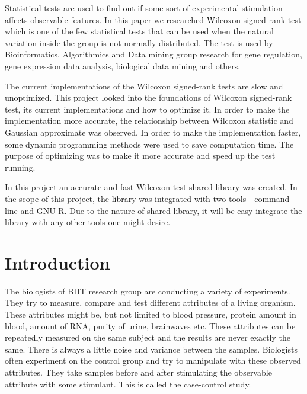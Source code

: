 \documentclass[12pt]{article}
\begin{document}
{
Statistical tests are used to find out if some sort of experimental stimulation affects observable features. In this paper we researched Wilcoxon signed-rank test which is one of the few statistical tests that can be used when the natural variation inside the group is not normally distributed. The test is used by Bioinformatics, Algorithmics and Data mining group research for gene regulation, gene expression data analysis, biological data mining and others.

The current implementations of the Wilcoxon signed-rank tests are slow and unoptimized. This project looked into the foundations of Wilcoxon signed-rank test, its current implementations and how to optimize it. In order to make the implementation more accurate, the relationship between Wilcoxon statistic and Gaussian approximate was observed. In order to make the implementation faster, some dynamic programming methods were used to save computation time. The purpose of optimizing was to make it more accurate and speed up the test running.

In this project an accurate and fast Wilcoxon test shared library was created. In the scope of this project, the library was integrated with two tools - command line and GNU-R. Due to the nature of shared library, it will be easy integrate the library with any other tools one might desire.

\vspace*{3ex}
{}



\newpage

\tableofcontents

\newpage

\section{Introduction}
The biologists of BIIT research group are conducting a variety of experiments. They try to measure, compare and test different attributes of a living organism. These attributes might be, but not limited to blood pressure, protein amount in blood, amount of RNA, purity of urine, brainwaves etc. These attributes can be repeatedly measured on the same subject and the results are never exactly the same. There is always a little noise and variance between the samples. Biologists often experiment on the control group and try to manipulate with these observed attributes. They take samples before and after stimulating the observable attribute with some stimulant. This is called the case-control study.

}
\end{document}
